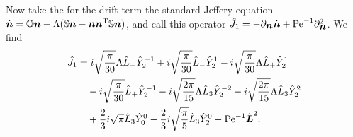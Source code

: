 \documentclass[thesis.tex]{subfiles}
\begin{document}
Now take the for the drift term the standard Jeffery equation $\dot {\mbox{\boldmath$n$}} = \mathbb{O} \mbox{\boldmath$n$} + \Lambda (\mathbb{S} \mbox{\boldmath$n$} - \mbox{\boldmath$n$} \mbox{\boldmath$n$}^{\mathrm T} \mathbb{S} \mbox{\boldmath$n$})$, and call this operator $\hat J_1 = -\partial_{\mbox{\boldmath$n$}}\dot{\mbox{\boldmath$n$}} + \mbox{Pe}^{-1}\partial^2_{\mbox{\boldmath$n$}}$. We find
\begin{align*}
	\hat J_1 &= 
	i \sqrt{\frac{\pi }{30}} \Lambda  \hat{L}_-\hat{Y}_{2}^{-1}+i \sqrt{\frac{\pi }{30}} \hat{L}_-\hat{Y}_{2}^{1}-i \sqrt{\frac{\pi }{30}} 
   \Lambda  \hat{L}_+\hat{Y}_{2}^{1} \\ 
   &\quad-  i \sqrt{\frac{\pi }{30}} \hat{L}_+\hat{Y}_{2}^{-1} 
   -i \sqrt{\frac{2 \pi }{15}} \Lambda 
   \hat{L}_3\hat{Y}_{2}^{-2}-i \sqrt{\frac{2 \pi }{15}} \Lambda  \hat{L}_3\hat{Y}_{2}^{2} \\ 
   &\quad
   +\frac{2}{3} i \sqrt{\pi } 
   \hat{L}_3\hat{Y}_{0}^{0}-\frac{2}{3} i \sqrt{\frac{\pi }{5}} \hat{L}_3\hat{Y}_{2}^{0}-\mbox{Pe}^{-1} \hat{\mbox{\boldmath$L$}}^2.
\end{align*}
\end{document}
